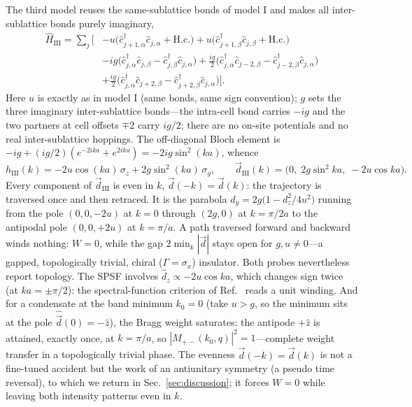\documentclass[onecolumn,aps,prl,superscriptaddress,longbibliography]{revtex4-2}
\begin{document}
The third model reuses the same-sublattice bonds of model I and makes all inter-sublattice bonds purely imaginary,
\begin{equation}\label{eq:modelIII}
\begin{split}
\hat{H}_{\mathrm{III}}=\sum_j\Big[
&-u\big(\hat{c}_{j+1,\alpha}^{\dagger}\hat{c}_{j,\alpha}+\mathrm{H.c.}\big)
+u\big(\hat{c}_{j+1,\beta}^{\dagger}\hat{c}_{j,\beta}+\mathrm{H.c.}\big)\\
&-ig\big(\hat{c}_{j,\alpha}^{\dagger}\hat{c}_{j,\beta}-\hat{c}_{j,\beta}^{\dagger}\hat{c}_{j,\alpha}\big)
+\frac{ig}{2}\big(\hat{c}_{j,\alpha}^{\dagger}\hat{c}_{j-2,\beta}-\hat{c}_{j-2,\beta}^{\dagger}\hat{c}_{j,\alpha}\big)\\
&+\frac{ig}{2}\big(\hat{c}_{j,\alpha}^{\dagger}\hat{c}_{j+2,\beta}-\hat{c}_{j+2,\beta}^{\dagger}\hat{c}_{j,\alpha}\big)
\Big].
\end{split}
\end{equation}
Here $u$ is exactly as in model I (same bonds, same sign convention); $g$ sets the three imaginary inter-sublattice bonds---the intra-cell bond carries $-ig$ and the two partners at cell offsets $\mp2$ carry $ig/2$; there are no on-site potentials and no real inter-sublattice hoppings. The off-diagonal Bloch element is $-ig+(ig/2)(e^{-2ika}+e^{2ika})=-2ig\sin^2(ka)$, whence
\begin{equation}\label{eq:modelIII_k}
h_{\mathrm{III}}(k)=-2u\cos(ka)\,\sigma_z+2g\sin^2(ka)\,\sigma_y,
\qquad
\vec{d}_{\mathrm{III}}(k)=\big(0,\;2g\sin^2 ka,\;-2u\cos ka\big).
\end{equation}
Every component of $\vec{d}_{\mathrm{III}}$ is even in $k$, $\vec{d}(-k)=\vec{d}(k)$: the trajectory is traversed once and then retraced. It is the parabola $d_y=2g\big(1-d_z^2/4u^2\big)$ running from the pole $(0,0,-2u)$ at $k=0$ through $(2g,0)$ at $k=\pi/2a$ to the antipodal pole $(0,0,+2u)$ at $k=\pi/a$. A path traversed forward and backward winds nothing: $W=0$, while the gap $2\min_k|\vec{d}|$ stays open for $g,u\neq0$---a gapped, topologically trivial, chiral ($\Gamma=\sigma_x$) insulator. Both probes nevertheless report topology. The SPSF involves $\hat{d}_z\propto-2u\cos ka$, which changes sign twice (at $ka=\pm\pi/2$): the spectral-function criterion of Ref.~\cite{estakeRoy2025} reads a unit winding. And for a condensate at the band minimum $k_0=0$ (take $u>g$, so the minimum sits at the pole $\hat{\vec{d}}(0)=-\hat{z}$), the Bragg weight saturates: the antipode $+\hat{z}$ is attained, exactly once, at $k=\pi/a$, so $|M_{+-}(k_0,q)|^2=1$---complete weight transfer in a topologically trivial phase. The evenness $\vec{d}(-k)=\vec{d}(k)$ is not a fine-tuned accident but the work of an antiunitary symmetry (a pseudo time reversal), to which we return in Sec.~\ref{sec:discussion}; it forces $W=0$ while leaving both intensity patterns even in $k$.
\end{document}
